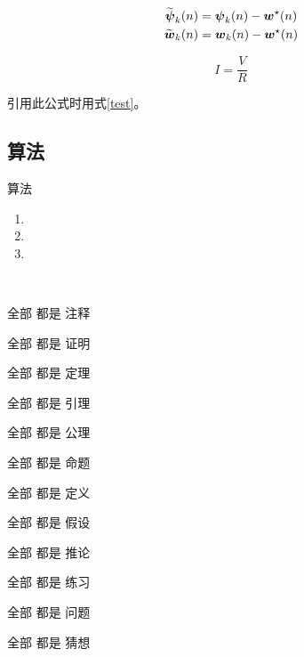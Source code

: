 \begin{align}
	\label{eq:error1}
	{\widetilde{\boldsymbol\psi}}_k(n) &= {\boldsymbol \psi}_k(n) - {\boldsymbol w}^\star(n) \\
	\label{eq:error2}
	{\widetilde{\boldsymbol w}}_k(n) &= {\boldsymbol w}_k(n) - {\boldsymbol w}^\star(n)
\end{align}


\begin{equation}\label{test}
	I=\frac VR
\end{equation}

引用此公式时用式\eqref{test}。

\subsection{算法}

算法\cite{cottrell2009}
\begin{enumerate}
	\item[1.] 
	\item[2.] 
	\item[3.] 
\end{enumerate}


\begin{algorithm}[!ht]
	\caption{算法流程图名字} %
	\label{algorithm}
	\begin{algorithmic}[!h]
		\EndFor
		\EndFor
		\EndFor
	\end{algorithmic}
\end{algorithm}

\begin{remark}
	全部
	都是
	注释
\end{remark}

\begin{prof}
	全部
	都是
	证明
\end{prof}
\begin{theorem}
	全部
	都是
	定理
\end{theorem}
\begin{lemma}
	全部
	都是
	引理
\end{lemma}
\begin{axiom}
	全部
	都是
	公理
\end{axiom}
\begin{proposition}
	全部
	都是
	命题
\end{proposition}
\begin{definition}
	全部
	都是
	定义
\end{definition}
\begin{assumption}
	全部
	都是
	假设
\end{assumption}

\begin{corollary}
	全部
	都是
	推论
\end{corollary}
\begin{exercise}
	全部
	都是
	练习
\end{exercise}

\begin{problem}
	全部
	都是
	问题
\end{problem}
\begin{conjecture}
	全部
	都是
	猜想
\end{conjecture}



